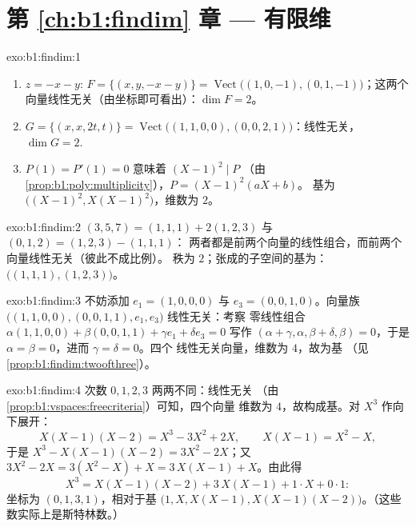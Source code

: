 \section*{第 \ref{ch:b1:findim} 章 --- 有限维}

\begin{solution}{exo:b1:findim:1}
\begin{enumerate}
  \item $z = -x - y$: $F = \{(x, y, -x-y)\} =
        \operatorname{Vect}\bigl((1,0,-1), (0,1,-1)\bigr)$；这两个
        向量线性无关（由坐标即可看出）：$\dim F = 2$。
  \item $G = \{(x, x, 2t, t)\} =
        \operatorname{Vect}\bigl((1,1,0,0), (0,0,2,1)\bigr)$：线性无关，
        $\dim G = 2$.
  \item $P(1) = P'(1) = 0$ 意味着 $(X-1)^2 \mid P$
        （由\cref{prop:b1:poly:multiplicity}），$P = (X-1)^2(aX + b)$。
        基为 $\bigl((X-1)^2, X(X-1)^2\bigr)$，维数为 $2$。
\end{enumerate}
\end{solution}

\begin{solution}{exo:b1:findim:2}
$(3,5,7) = (1,1,1) + 2(1,2,3)$ 与 $(0,1,2) = (1,2,3) - (1,1,1)$：
两者都是前两个向量的线性组合，而前两个向量线性无关（彼此不成比例）。
秩为 $2$；张成的子空间的基为：
$\bigl((1,1,1), (1,2,3)\bigr)$。
\end{solution}

\begin{solution}{exo:b1:findim:3}
不妨添加 $e_1 = (1,0,0,0)$ 与 $e_3 = (0,0,1,0)$。向量族
$\bigl((1,1,0,0), (0,0,1,1), e_1, e_3\bigr)$ 线性无关：考察
零线性组合 $\alpha(1,1,0,0) + \beta(0,0,1,1) + \gamma e_1 + \delta
e_3 = 0$ 写作 $(\alpha + \gamma, \alpha, \beta + \delta, \beta) =
0$，于是 $\alpha = \beta = 0$，进而 $\gamma = \delta = 0$。四个
线性无关向量，维数为 $4$，故为基
        （见\cref{prop:b1:findim:twoofthree}）。
\end{solution}

\begin{solution}{exo:b1:findim:4}
次数 $0, 1, 2, 3$ 两两不同：线性无关
        （由\cref{prop:b1:vspaces:freecriteria}）可知，四个向量
维数为 $4$，故构成基。对 $X^3$ 作向下展开：
\[
X(X-1)(X-2) = X^3 - 3X^2 + 2X,
\qquad
X(X-1) = X^2 - X,
\]
于是 $X^3 - X(X-1)(X-2) = 3X^2 - 2X$；又 $3X^2 - 2X = 3(X^2 - X) + X
= 3\,X(X-1) + X$。由此得
\[
X^3 = X(X-1)(X-2) + 3\,X(X-1) + 1\cdot X + 0\cdot 1 :
\]
坐标为 $(0, 1, 3, 1)$，相对于基 $\bigl(1, X, X(X-1),
X(X-1)(X-2)\bigr)$。（这些数实际上是斯特林数。）
\end{solution}

